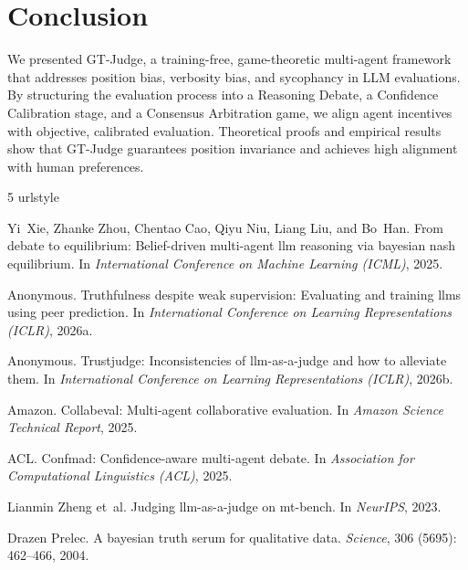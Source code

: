 \documentclass[11pt,a4paper]{article}
\begin{document}
\section{Conclusion}
We presented GT-Judge, a training-free, game-theoretic multi-agent framework that addresses position bias, verbosity bias, and sycophancy in LLM evaluations. By structuring the evaluation process into a Reasoning Debate, a Confidence Calibration stage, and a Consensus Arbitration game, we align agent incentives with objective, calibrated evaluation. Theoretical proofs and empirical results show that GT-Judge guarantees position invariance and achieves high alignment with human preferences.


\begin{thebibliography}{5}
\providecommand{\natexlab}[1]{#1}
\providecommand{\url}[1]{\texttt{#1}}
\expandafter\ifx\csname urlstyle\endcsname\relax
  \providecommand{\doi}[1]{doi: #1}\else
  \providecommand{\doi}{doi: \begingroup \urlstyle{rm}\Url}\fi

Yi~Xie, Zhanke Zhou, Chentao Cao, Qiyu Niu, Liang Liu, and Bo~Han.
\newblock From debate to equilibrium: Belief-driven multi-agent llm reasoning via bayesian nash equilibrium.
\newblock In \emph{International Conference on Machine Learning (ICML)}, 2025.

\bibitem[Anonymous(2026{\natexlab{a}})]{peer2026}
Anonymous.
\newblock Truthfulness despite weak supervision: Evaluating and training llms using peer prediction.
\newblock In \emph{International Conference on Learning Representations (ICLR)}, 2026{\natexlab{a}}.

\bibitem[Anonymous(2026{\natexlab{b}})]{trustjudge2026}
Anonymous.
\newblock Trustjudge: Inconsistencies of llm-as-a-judge and how to alleviate them.
\newblock In \emph{International Conference on Learning Representations (ICLR)}, 2026{\natexlab{b}}.

Amazon.
\newblock Collabeval: Multi-agent collaborative evaluation.
\newblock In \emph{Amazon Science Technical Report}, 2025.

ACL.
\newblock Confmad: Confidence-aware multi-agent debate.
\newblock In \emph{Association for Computational Linguistics (ACL)}, 2025.

Lianmin Zheng et~al.
\newblock Judging llm-as-a-judge on mt-bench.
\newblock In \emph{NeurIPS}, 2023.

Drazen Prelec.
\newblock A bayesian truth serum for qualitative data.
\newblock \emph{Science}, 306 (5695): 462--466, 2004.

\end{thebibliography}
\end{document}
